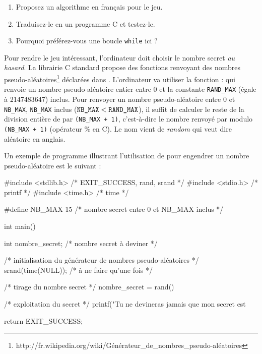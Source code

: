 \begin{enumerate}
\item Proposez un algorithme en français pour le jeu.
\item Traduisez-le en un programme C  et testez-le.
\item Pourquoi préférez-vous une boucle \verb|while| ici ?
\end{enumerate}

Pour rendre le jeu intéressant, l'ordinateur doit choisir le nombre secret \emph{au hasard}. La librairie C standard propose des fonctions renvoyant des nombres pseudo-aléatoires\footnote{http://fr.wikipedia.org/wiki/Générateur\_de\_nombres\_pseudo-aléatoires} déclarées dans . L'ordinateur va utiliser la fonction :
qui renvoie un nombre pseudo-aléatoire entier entre 0 et la constante
\verb|RAND_MAX| (égale à 2147483647) inclus. Pour renvoyer un nombre
pseudo-aléatoire entre 0 et \verb|NB_MAX|, \verb|NB_MAX| inclus
($\verb|NB_MAX| < \verb|RAND_MAX|$), il suffit de calculer le reste
de la division entière de  par \verb|(NB_MAX + 1)|,
c'est-à-dire le nombre renvoyé par   modulo \verb|(NB_MAX + 1)|
(opérateur \% en C). Le nom  vient de \emph{random} qui veut dire aléatoire en anglais.

Un exemple de programme illustrant l'utilisation de  pour
engendrer un nombre pseudo-aléatoire est le suivant :
\begin{small}
\begin{listing}{1}
#include <stdlib.h> /* EXIT_SUCCESS, rand, srand */
#include <stdio.h> /* printf */
#include <time.h> /* time */

#define NB_MAX 15 /* nombre secret entre 0 et NB_MAX inclus */

int main()
{
    int nombre_secret; /* nombre secret à deviner */

    /* initialisation du générateur de nombres pseudo-aléatoires */
    srand(time(NULL)); /* à ne faire qu'une fois */

    /* tirage du nombre secret */
    nombre_secret = rand() %

    /* exploitation du secret */
    printf("Tu ne devineras jamais que mon secret est %

    return EXIT_SUCCESS;
}
\end{listing}
\end{small}

